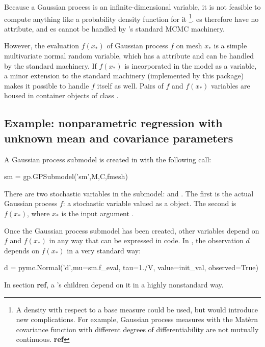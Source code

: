 Because a Gaussian process is an infinite-dimensional variable, it is not feasible to compute anything like a probability density function for it \footnote{A density with respect to a base measure could be used, but would introduce new complications. For example, Gaussian process measures with the Mat\`ern covariance function with different degrees of differentiability are not mutually continuous. \textbf{ref}}. es therefore have no  attribute, and es cannot be handled by 's standard MCMC machinery.

However, the evaluation $f(x_*)$ of Gaussian process $f$ on mesh $x_*$ is a simple multivariate normal random variable, which has a  attribute and can be handled by the standard machinery. If $f(x_*)$ is incorporated in the model as a variable, a minor extension to the standard machinery (implemented by this package) makes it possible to handle $f$ itself as well. Pairs of $f$ and $f(x_*)$ variables are housed in container objects of class .

\subsection{Example: nonparametric regression with unknown mean and covariance parameters}\label{sub:BasicMCMC}

A Gaussian process submodel is created in  with the following call:
\begin{CodeChunk}
\begin{CodeInput}
sm = gp.GPSubmodel('sm',M,C,fmesh)
\end{CodeInput}
\end{CodeChunk}
There are two stochastic variables in the submodel:  and . The first is the actual Gaussian process $f$: a stochastic variable valued as a  object. The second is $f(x_*)$, where $x_*$ is the input argument .

Once the Gaussian process submodel has been created, other variables depend on $f$ and $f(x_*)$ in any way that can be expressed in  code. In , the observation $d$ depends on $f(x_*)$ in a very standard way:
\begin{CodeChunk}
\begin{CodeInput}
d = pymc.Normal('d',mu=sm.f_eval, tau=1./V, value=init_val, observed=True)
\end{CodeInput}
\end{CodeChunk}
In section \textbf{ref}, a 's children depend on it in a highly nonstandard way.


